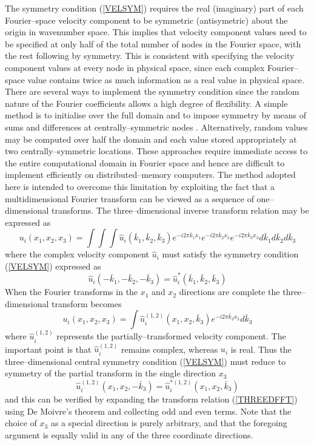 \documentclass[dvips]{article}
\begin{document}
The symmetry condition (\ref{VELSYM}) requires the real (imaginary) part of
each Fourier--space velocity component to be symmetric (antisymetric) about
the origin in wavenumber space.
This implies that velocity component values need to be specified at only half
of the
total number of nodes in the Fourier space, with the rest following by symmetry.
This is consistent with specifying the
velocity component values at every node in physical space, since each
complex Fourier--space value contains twice as much information as a real
value in physical space.  There are several ways to implement the symmetry
condition since the
random nature of the Fourier coefficients allows a high degree of flexibility.
A simple method is to initialise over the full domain and to impose symmetry
by means of sums and differences at centrally--symmetric
nodes \cite{orszaginit}.  Alternatively, random values may be computed over
half the domain and each value stored appropriately at two centrally--symmetric
locations.  These approaches require immediate access to the entire
computational domain in Fourier space and hence are
difficult to implement efficiently on distributed--memory computers.
The method adopted here is intended to overcome this limitation by
exploiting the fact that a multidimensional Fourier transform can be viewed
as a sequence of one--dimensional transforms.  The three--dimensional
inverse transform relation may be expressed as
\begin{equation}
u_{i}(x_{1},x_{2},x_{3}) = \int\int\int
\hat{u}_{i}(\bar{k}_{1},\bar{k}_{2},\bar{k}_{3})
e^{-i2\pi \bar{k}_{1}x_{1}}e^{-i2\pi \bar{k}_{2}x_{2}}e^{-i2\pi \bar{k}_{3}x_{3}}
d\bar{k}_{1} d\bar{k}_{2} d\bar{k}_{3}
\label{THREEDFFT}
\end{equation} 
where the complex velocity component $\hat{u}_{i}$ must satisfy
the symmetry condition (\ref{VELSYM}) expressed as
\begin{equation}
\hat{u}_{i}(-\bar{k}_{1},-\bar{k}_{2},-\bar{k}_{3}) =
\hat{u}_{i}^{*}(\bar{k}_{1},\bar{k}_{2},\bar{k}_{3})
\end{equation}
When the Fourier transforms in the $x_{1}$ and $x_{2}$ directions are
complete the three--dimensional transform becomes
\begin{equation}
u_{i}(x_{1},x_{2},x_{3}) = \int
\hat{u}_{i}^{(1,2)}(x_{1},x_{2},\bar{k}_{3})
e^{-i2\pi \bar{k}_{3}x_{3}}
d\bar{k}_{3}
\label{THREE2FFT}
\end{equation}
where $\hat{u}_{i}^{(1,2)}$ represents the partially--transformed
velocity component.  The important point is that $\hat{u}_{i}^{(1,2)}$
remains complex, whereas $u_{i}$ is real.  Thus the three--dimensional central
symmetry condition (\ref{VELSYM}) must reduce to symmetry of the partial
transform in the single direction $x_{3}$
\begin{equation}
\hat{u}_{i}^{(1,2)}(x_{1},x_{2},-\bar{k}_{3})
= \hat{u}_{i}^{*(1,2)}(x_{1},x_{2},\bar{k}_{3})
\label{SYM1D}
\end{equation}
and this can be verified by expanding the transform relation
(\ref{THREEDFFT}) using De Moivre's theorem and collecting odd and even terms.
Note that the choice of $x_{3}$ as a special direction is
purely arbitrary, and that the foregoing argument is equally valid 
in any of the three coordinate directions.
\end{document}
